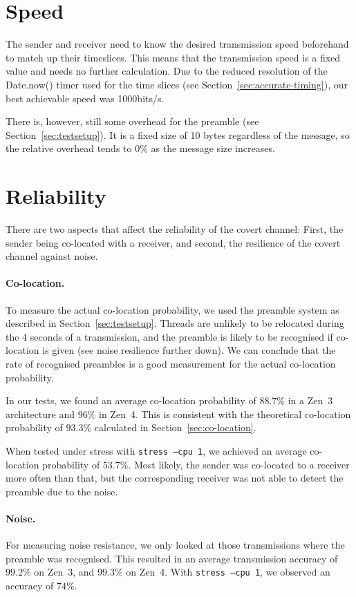 \documentclass[11pt,
  titlepage=false,
]{scrreprt}
\begin{document}
\section{Speed}
The sender and receiver need to know the desired transmission speed beforehand to match up their timeslices.
This means that the transmission speed is a fixed value and needs no further calculation.
Due to the reduced resolution of the Date.now() timer used for the time slices (see Section~\ref{sec:accurate-timing}),
our best achievable speed was 1000bits/s.

There is, however, still some overhead for the preamble (see Section~\ref{sec:testsetup}).
It is a fixed size of 10 bytes regardless of the message,
so the relative overhead tends to $0\%$ as the message size increases.

\section{Reliability}
There are two aspects that affect the reliability of the covert channel:
First, the sender being co-located with a receiver, and second, the resilience of the covert channel against noise.

\paragraph{Co-location.}
To measure the actual co-location probability, we used the preamble system as described in Section~\ref{sec:testsetup}.
Threads are unlikely to be relocated during the 4 seconds of a transmission,
and the preamble is likely to be recognised if co-location is given (see noise resilience further down).
We can conclude that the rate of recognised preambles is a good measurement for the actual co-location probability.

In our tests, we found an average co-location probability of $88.7\%$ in a Zen~3 architecture and $96\%$ in Zen~4.
This is consistent with the theoretical co-location probability of $93.3\%$ calculated in Section~\ref{sec:co-location}.

When tested under stress with \texttt{stress --cpu 1}, we achieved an average co-location probability of $53.7\%$.
Most likely, the sender was co-located to a receiver more often than that,
but the corresponding receiver was not able to detect the preamble due to the noise.

\paragraph{Noise.}
For measuring noise resistance, we only looked at those transmissions where the preamble was recognised.
This resulted in an average transmission accuracy of $99.2\%$ on Zen~3, and $99.3\%$ on Zen~4.
With \texttt{stress --cpu 1}, we observed an accuracy of $74\%$.
\end{document}
